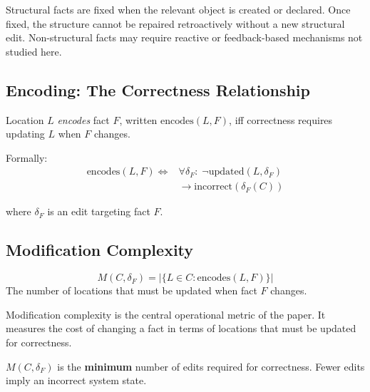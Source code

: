 Structural facts are fixed when the relevant object is created or declared. Once fixed, the structure cannot be repaired retroactively without a new structural edit. Non-structural facts may require reactive or feedback-based mechanisms not studied here.

\subsection{Encoding: The Correctness Relationship}\label{sec:encoding}

\begin{definition}[Encodes]\label{def:encodes}
Location $L$ \emph{encodes} fact $F$, written $\text{encodes}(L, F)$, iff correctness requires updating $L$ when $F$ changes.

Formally:
\[
\begin{aligned}
\text{encodes}(L, F) \Longleftrightarrow {} &
\forall \delta_F:\; \neg\text{updated}(L, \delta_F) \\
& \rightarrow \text{incorrect}(\delta_F(C))
\end{aligned}
\]

where $\delta_F$ is an edit targeting fact $F$.
\end{definition}

\subsection{Modification Complexity}\label{sec:mod-complexity}

\begin{definition}\label{def:mod-complexity}
\[
M(C, \delta_F) = |\{L \in C : \text{encodes}(L, F)\}|
\]
The number of locations that must be updated when fact $F$ changes.
\end{definition}

Modification complexity is the central operational metric of the paper. It measures the cost of changing a fact in terms of locations that must be updated for correctness.

\begin{theorem}\label{thm:correctness-forcing}
$M(C, \delta_F)$ is the \textbf{minimum} number of edits required for correctness. Fewer edits imply an incorrect system state.
\end{theorem}

